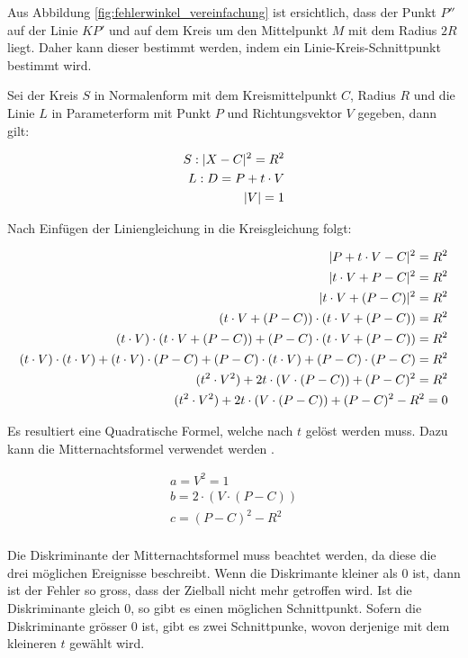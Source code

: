 Aus Abbildung \ref{fig:fehlerwinkel_vereinfachung} ist ersichtlich, dass der Punkt $P''$ auf der Linie $KP'$ und auf dem
Kreis um den Mittelpunkt $M$ mit dem Radius $2R$ liegt. Daher kann dieser bestimmt werden, indem ein Linie-Kreis-Schnittpunkt
bestimmt wird.

Sei der Kreis $S$ in Normalenform mit dem Kreismittelpunkt $C$, Radius $R$
und die Linie $L$ in Parameterform mit Punkt $P$ und Richtungsvektor $V$ gegeben, dann gilt:

\begin{align}
    S: \lvert X - C \rvert^2 = R^2\\
    L: D = P + t \cdot V\\
    \lvert V \rvert = 1
\end{align}

Nach Einfügen der Liniengleichung in die Kreisgleichung folgt:

\begin{align}
    \lvert P + t \cdot V - C \rvert^2 = R^2\\
    \lvert t \cdot V + P - C \rvert^2 = R^2\\
    \lvert t \cdot V + (P - C) \rvert^2 = R^2\\
    (t \cdot V + (P - C)) \cdot (t \cdot V + (P - C)) = R^2\\
    (t \cdot V) \cdot (t \cdot V + (P - C)) + (P - C) \cdot (t \cdot V + (P - C)) = R^2\\
    (t \cdot V) \cdot (t \cdot V) + (t \cdot V) \cdot (P - C) + (P - C) \cdot (t \cdot V) + (P - C) \cdot (P - C) = R^2\\
    (t^2 \cdot V^2) + 2t \cdot (V \cdot (P - C)) + (P - C)^2 = R^2\\
    (t^2 \cdot V^2) + 2t \cdot (V \cdot (P - C)) + (P - C)^2 - R^2 = 0\\
\end{align}

Es resultiert eine Quadratische Formel, welche nach $t$ gelöst werden muss.
Dazu kann die Mitternachtsformel verwendet werden \cite{wiki.mitternachtsformel:1}.

\begin{align}
    a = V^2 = 1\\
    b = 2 \cdot (V \cdot (P - C))\\
    c = (P - C)^2 - R^2\\
\end{align}

Die Diskriminante der Mitternachtsformel muss beachtet werden, da diese die drei möglichen Ereignisse beschreibt.
Wenn die Diskrimante kleiner als 0 ist, dann ist der Fehler so gross, dass der Zielball nicht mehr getroffen wird.
Ist die Diskriminante gleich 0, so gibt es einen möglichen Schnittpunkt.
Sofern die Diskriminante grösser 0 ist, gibt es zwei Schnittpunke, wovon derjenige mit dem kleineren $t$ gewählt wird.

